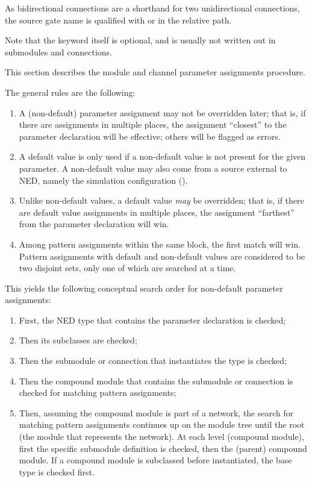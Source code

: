 {\begin{note}
As bidirectional connections are a shorthand for two unidirectional
connections, the source gate name is qualified with  or
 in the relative path.
\end{note}

Note that the  keyword itself is optional,
and is usually not written out in submodules and connections.

This section describes the module and channel parameter assignments procedure.

The general rules are the following:

\begin{enumerate}
  \item A (non-default) parameter assignment may not be overridden later;
    that is, if there are assignments in multiple places, the assignment
    ``closest'' to the parameter declaration will be effective; others
    will be flagged as errors.
  \item A default value is only used if a non-default value is not present
    for the given parameter. A non-default value may also come from a source
    external to NED, namely the simulation configuration ().
  \item Unlike non-default values, a default value \textit{may} be overridden;
    that is, if there are default value assignments in multiple places,
    the assignment ``farthest'' from the parameter declaration will win.
  \item Among pattern assignments within the same 
    block, the first match will win. Pattern assignments with default and
    non-default values are considered to be two disjoint sets, only one of
    which are searched at a time.
\end{enumerate}

This yields the following conceptual search order for non-default parameter
assignments:

\begin{enumerate}
  \item First, the NED type that contains the parameter declaration is checked;
  \item Then its subclasses are checked;
  \item Then the submodule or connection that instantiates the type is checked;
  \item Then the compound module that contains the submodule or connection is
    checked for matching pattern assignments;
  \item Then, assuming the compound module is part of a network, the search
    for matching pattern assignments continues up on the module tree until the root
    (the module that represents the network). At each level (compound module),
    first the specific submodule definition is checked, then the (parent) compound module.
    If a compound module is subclassed before instantiated, the base type is checked
    first.
\end{enumerate}

}

